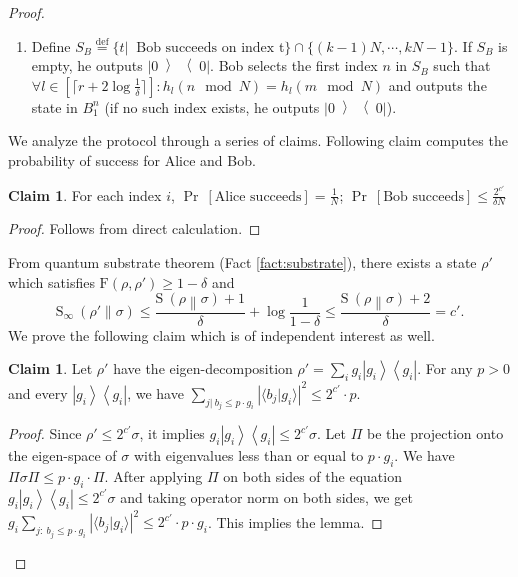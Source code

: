 \documentclass[11pt,a4paper]{article}
\def\F{\mathrn{F}}
\theoremstyle{plain}
\theoremstyle{definition}
\newtheorem{claim}[theorem]{Claim}
\newcommand {\br} [1] {\ensuremath{ \left( #1 \right) }}
\newcommand {\Br} [1] {\ensuremath{ \left[ #1 \right] }}
\newcommand {\minusspace} {\: \! \!}
\newcommand {\fn} [2] {\ensuremath{ #1 \minusspace \br{ #2 } }}
\newcommand {\Fn} [2] {\ensuremath{ #1 \minusspace \Br{ #2 } }}
\newcommand {\defeq} {\ensuremath{ \stackrel{\mathrm{def}}{=} }}
\newcommand {\prob} [1] {\Fn{\Pr}{#1}}
\newcommand {\abs} [1] {\ensuremath{ \left| #1 \right| }}
\newcommand {\relent} [2] {\fn{\mathrm{S}}{#1 \middle\| #2}}
\newcommand {\rminent} [2] {\fn{\mathrm{S}_{\infty}}{#1 \middle\| #2}}
\newcommand {\bra} [1] {\ensuremath{ \left\langle #1 \right| }}
\newcommand {\ket} [1] {\ensuremath{ \left| #1 \right\rangle }}
\newcommand {\ketbratwo} [2] {\ensuremath{ \left| #1 \middle\rangle \middle\langle #2 \right| }}
\newcommand {\ketbra} [1] {\ketbratwo{#1}{#1}}
\def\F{\mathrm{F}}
\newcommand{\braket}[2]{\langle#1|#2\rangle}
\begin{document}
\begin{proof}
\begin{mdframed}
\begin{enumerate}
\item  Define $S_B \defeq \{ t |~ \text{ Bob succeeds on index } $t$\} \cap \{(k-1)N,  \cdots, k N -1\}$. If $S_B$ is empty, he outputs $\ketbra{0}$. Bob selects the first index $n$ in $S_B$ such that $\forall l \in  [\lceil r + 2\log\frac{1}{\delta}\rceil]: h_l(n \mod N) = h_l(m \mod N) $ and outputs the state in $B_1^n$ (if no such index exists, he outputs $\ketbra{0}$).  

\end{enumerate}

\end{mdframed}
\bigskip

We analyze the protocol through a series of claims. 
Following claim computes the probability of success for Alice and Bob.

\begin{claim}
\label{claim:successprob}
For each index $i$, $\prob{\text{Alice succeeds}}=\frac{1}{N}$; $\prob{\text{Bob succeeds}}\leq\frac{2^{c'}}{\delta N}$
\end{claim}

\begin{proof}
Follows from direct calculation.
\end{proof}

From quantum substrate theorem (Fact \ref{fact:substrate}), there exists a state $\rho'$ which satisfies $\F(\rho,\rho')\geq 1-\delta$ and $$\rminent{\rho'}{\sigma}\leq\frac{\relent{\rho}{\sigma}+1}{\delta}+\log\frac{1}{1-\delta}\leq \frac{\relent{\rho}{\sigma}+2}{\delta}=c'.$$ We prove the following claim which is of independent interest as well. 
\begin{claim}\label{claim:1}
Let $\rho'$ have the eigen-decomposition $\rho' = \sum_i g_i\ket{g_i}\bra{g_i}$. For any $p>0$ and every $\ket{g_i}\bra{g_i}$, we have $\sum_{j|~b_j\leq p\cdot g_i}\abs{\braket{b_j}{g_i}}^2 \leq 2^{c'}\cdot p$.
\end{claim}
\begin{proof}
Since  $\rho' \leq 2^{c'}\sigma$, it implies $g_i\ket{g_i}\bra{g_i} \leq 2^{c'}\sigma$. Let $\Pi$ be the projection onto the eigen-space of $\sigma$ with eigenvalues less than or equal to $p\cdot g_i$. We have $\Pi\sigma\Pi \leq p\cdot g_i\cdot\Pi$. After applying $\Pi$ on both sides of the equation $g_i\ket{g_i}\bra{g_i} \leq 2^{c'}\sigma$ and taking operator norm on both sides, we get $g_i\sum_{j:~b_j \leq p\cdot g_i}\abs{\braket{b_j}{g_i}}^2 \leq 2^{c'}\cdot p \cdot g_i $. This implies the lemma. 
\end{proof}


\end{proof}
\end{document}
